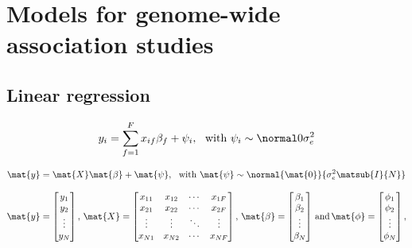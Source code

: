 \section{Models for genome-wide association studies}
\label{section:LinearModels}
\subsection{Linear regression}
\begin{equation}
y_i = \sum^{F}_{f=1}x_{if}\beta_{f} + \psi_i, \,\,\,\, \text{with }  \psi_i \sim \normal 0 {\sigma^2_e}
\end{equation}

\begin{equation}
\mat{y} = \mat{X}\mat{\beta} + \mat{\psi}, \,\,\,\, \text{with }  \mat{\psi} \sim  \normal {\mat{0}}{\sigma^2_e\matsub{I}{N}}
\end{equation}

\begin{equation}
 \mat{y} =
  \begin{bmatrix} 
 	y_{1} \\
 	y_{2} \\
 	\vdots \\
 	y_{N} 
 \end{bmatrix}, \,
%
 \mat{X} =
  \begin{bmatrix}
   x_{11} & x_{12} & \cdots & x_{1F} \\
   x_{21} & x_{22} & \cdots & x_{2F} \\
   \vdots & \vdots & \ddots & \vdots \\
   x_{N1} & x_{N2} & \cdots & x_{NF} 
   \end{bmatrix}, \,
%
 \mat{\beta} =
  \begin{bmatrix} 
 	\beta_{1} \\
 	\beta_{2} \\
 	\vdots \\
 	\beta_{N} 
 \end{bmatrix}\,\text{and} \, 
%
\mat{\phi} =
  \begin{bmatrix} 
 	\phi_{1} \\
 	\phi_{2} \\
 	\vdots \\
 	\phi_{N} 
 \end{bmatrix},
\end{equation}

